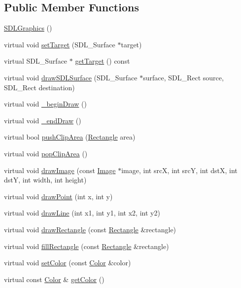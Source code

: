 \subsection*{Public Member Functions}
\begin{DoxyCompactItemize}
\item 
\hyperlink{classgcn_1_1SDLGraphics_a20ad9e8fcb2fe68894ade3f48f2e6853}{S\+D\+L\+Graphics} ()
\item 
virtual void \hyperlink{classgcn_1_1SDLGraphics_a087add21b88b101096cbfd052f4b4a8f}{set\+Target} (S\+D\+L\+\_\+\+Surface $\ast$target)
\item 
virtual S\+D\+L\+\_\+\+Surface $\ast$ \hyperlink{classgcn_1_1SDLGraphics_a1e5d70320dcf5c96b3aee922ad6b5c66}{get\+Target} () const 
\item 
virtual void \hyperlink{classgcn_1_1SDLGraphics_a38369ee1d6be599abecdaa7cf17aaba4}{draw\+S\+D\+L\+Surface} (S\+D\+L\+\_\+\+Surface $\ast$surface, S\+D\+L\+\_\+\+Rect source, S\+D\+L\+\_\+\+Rect destination)
\item 
virtual void \hyperlink{classgcn_1_1SDLGraphics_a8a551d5159bb79dd7d77cd081f5d9c78}{\+\_\+begin\+Draw} ()
\item 
virtual void \hyperlink{classgcn_1_1SDLGraphics_a1ec61016736b34271f60e3a88d65c1b7}{\+\_\+end\+Draw} ()
\item 
virtual bool \hyperlink{classgcn_1_1SDLGraphics_a1fbd23bf7540f15bb9e07ee378d60e25}{push\+Clip\+Area} (\hyperlink{classgcn_1_1Rectangle}{Rectangle} area)
\item 
virtual void \hyperlink{classgcn_1_1SDLGraphics_a6876d1027cb3feb4a413e3e854812a4b}{pop\+Clip\+Area} ()
\item 
virtual void \hyperlink{classgcn_1_1SDLGraphics_adaaf65022086f36b9aa4d9190fd092f0}{draw\+Image} (const \hyperlink{classgcn_1_1Image}{Image} $\ast$image, int srcX, int srcY, int dstX, int dstY, int width, int height)
\item 
virtual void \hyperlink{classgcn_1_1SDLGraphics_a5f670d60ecbf4b716f005db098363915}{draw\+Point} (int x, int y)
\item 
virtual void \hyperlink{classgcn_1_1SDLGraphics_adcb7d5d91da928a92c82ad1fc5fba273}{draw\+Line} (int x1, int y1, int x2, int y2)
\item 
virtual void \hyperlink{classgcn_1_1SDLGraphics_a17607f95e7af8fc9c55d112753ef9873}{draw\+Rectangle} (const \hyperlink{classgcn_1_1Rectangle}{Rectangle} \&rectangle)
\item 
virtual void \hyperlink{classgcn_1_1SDLGraphics_a8d3fba4fa40d9d5ef436b836dfd25804}{fill\+Rectangle} (const \hyperlink{classgcn_1_1Rectangle}{Rectangle} \&rectangle)
\item 
virtual void \hyperlink{classgcn_1_1SDLGraphics_a26298c36c21fc6e16b02a932627adae6}{set\+Color} (const \hyperlink{classgcn_1_1Color}{Color} \&color)
\item 
virtual const \hyperlink{classgcn_1_1Color}{Color} \& \hyperlink{classgcn_1_1SDLGraphics_a64363f22dce7278007350cfab8569d58}{get\+Color} ()
\end{DoxyCompactItemize}
